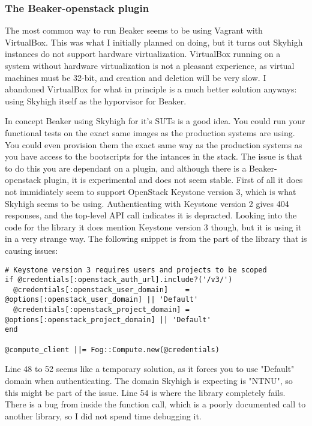 \subsubsection{The Beaker-openstack plugin}

The most common way to run Beaker seems to be using Vagrant with VirtualBox. This was what I initially planned on doing, but it turns out Skyhigh instances do not support hardware virtualization. VirtualBox running on a system without hardware virtualization is not a pleasant experience, as virtual machines must be 32-bit, and creation and deletion will be very slow. I abandoned VirtualBox for what in principle is a much better solution anyways: using Skyhigh itself as the hyporvisor for Beaker.

In concept Beaker using Skyhigh for it's SUTs is a good idea. You could run your functional tests on the exact same images as the production systems are using. You could even provision them the exact same way as the production systems as you have access to the bootscripts for the intances in the stack. The issue is that to do this you are dependant on a plugin, and although there is a Beaker-openstack plugin, it is experimental and does not seem stable. First of all it does not immidiately seem to support OpenStack Keystone version 3, which is what Skyhigh seems to be using. Authenticating with Keystone version 2 gives 404 responses, and the top-level API call indicates it is depracted. Looking into the code for the library it does mention Keystone version 3 though, but it is using it in a very strange way. The following snippet is from the part of the library that is causing issues:

\begin{verbatim}
# Keystone version 3 requires users and projects to be scoped
if @credentials[:openstack_auth_url].include?('/v3/')
  @credentials[:openstack_user_domain]    = @options[:openstack_user_domain] || 'Default'
  @credentials[:openstack_project_domain] = @options[:openstack_project_domain] || 'Default'
end

@compute_client ||= Fog::Compute.new(@credentials)
\end{verbatim}

Line 48 to 52 seems like a temporary solution, as it forces you to use "Default" domain when authenticating. The domain Skyhigh is expecting is "NTNU", so this might be part of the issue. Line 54 is where the library completely fails. There is a bug from inside the function call, which is a poorly documented call to another library, so I did not spend time debugging it.

